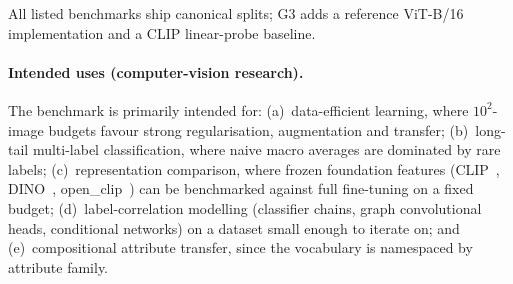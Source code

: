\documentclass[11pt,a4paper]{article}
\begin{document}
\begin{table}[t]
\centering
\caption{Comparison with established fine-grained and attribute
benchmarks. G3 is intentionally at the low end of the scale axis
and in the multi-label attribute niche, with canonical splits and a
reference implementation shipped alongside the data.}
\label{tab:related}
\small
\setlength{\tabcolsep}{4pt}
\par\smallskip
\footnotesize All listed benchmarks ship canonical splits; G3 adds a reference ViT-B/16 implementation and a CLIP linear-probe baseline.
\end{table}

\paragraph{Intended uses (computer-vision research).} The benchmark
is primarily intended for: (a)~data-efficient learning, where
$10^2$-image budgets favour strong regularisation, augmentation and
transfer; (b)~long-tail multi-label classification, where naive
macro averages are dominated by rare labels; (c)~representation
comparison, where frozen foundation features
(CLIP~\citep{radford2021clip}, DINO~\citep{caron2021dino},
open\_clip~\citep{ilharco2021openclip}) can be benchmarked against
full fine-tuning on a fixed
budget; (d)~label-correlation modelling (classifier chains, graph
convolutional heads, conditional networks) on a dataset small enough
to iterate on; and (e)~compositional attribute transfer, since the
vocabulary is namespaced by attribute family.
\end{document}
